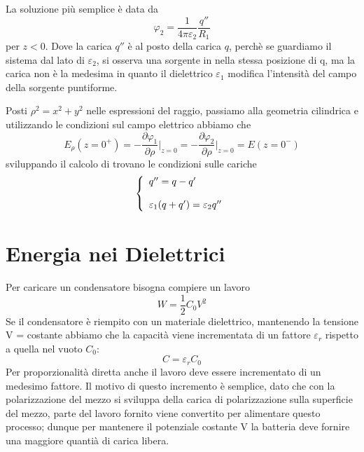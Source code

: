 La soluzione pi\`u semplice \`e data da 
\begin{equation*}
	\varphi_{2} = \frac{1}{4 \pi \varepsilon_{2}} \frac{q''}{R_1}
\end{equation*}
per $z<0$. Dove la carica $q''$ \`e al posto della carica $q$, perch\`e se guardiamo il sistema dal lato di $\varepsilon_{2}$, si osserva una sorgente in nella stessa posizione di q, ma la carica non \`e la medesima in quanto il dielettrico $\varepsilon_{1}$ modifica l'intensit\`a del campo della sorgente puntiforme.

Posti $\rho^2 = x^2 + y^2$ nelle espressioni del raggio, passiamo alla geometria cilindrica e utilizzando le condizioni sul campo elettrico abbiamo che 
\begin{equation*}
	E_{\rho}(z = 0^+) = - \frac{\partial \varphi_{1}}{\partial \rho}\vert_{z=0} = - \frac{\partial \varphi_{2}}{\partial \rho}\vert_{z=0}=E(z=0^-)
\end{equation*}
sviluppando il calcolo di trovano le condizioni sulle cariche 
\begin{equation*}
	\left \{ \begin{array}{l}
		q'' = q - q' \\ \rule{0pt}{20pt}
		\varepsilon_{1}(q+q') = \varepsilon_2 q''
	\end{array}\right.
\end{equation*}

\section{Energia nei Dielettrici}

Per caricare un condensatore bisogna compiere un lavoro 
\begin{equation*}
	W = \frac{1}{2} C_0 V^2
\end{equation*}
Se il condensatore \`e riempito con un materiale dielettrico, mantenendo la tensione V = costante abbiamo che la capacit\`a viene incrementata di un fattore $\varepsilon_{r}$ rispetto a quella nel vuoto $C_0$:
\begin{equation*}
	C = \varepsilon_{r} C_0
\end{equation*} 
Per proporzionalit\`a diretta anche il lavoro deve essere incrementato di un medesimo fattore. Il motivo di questo incremento \`e semplice, dato che con la polarizzazione del mezzo si sviluppa della carica di polarizzazione sulla superficie del mezzo, parte del lavoro fornito viene convertito per alimentare questo processo; dunque per mantenere il potenziale costante V la batteria deve fornire una maggiore quanti\`a di carica libera.

